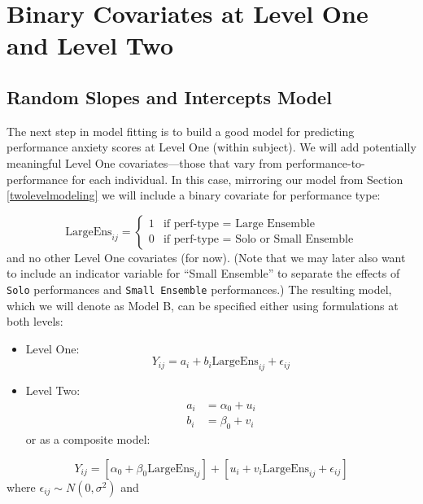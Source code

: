 \documentclass[
]{krantz}
\providecommand{\tightlist}{%
  \setlength{\itemsep}{0pt}\setlength{\parskip}{0pt}}
\begin{document}
\hypertarget{modelb}{%
\section{Binary Covariates at Level One and Level Two}\label{modelb}}

\hypertarget{randomslopeandint}{%
\subsection{Random Slopes and Intercepts Model}\label{randomslopeandint}}

The next step in model fitting is to build a good model for predicting performance anxiety scores at Level One (within subject). We will add potentially meaningful Level One covariates---those that vary from performance-to-performance for each individual.  In this case, mirroring our model from Section \ref{twolevelmodeling} we will include a binary covariate for performance type:

\[ \textrm{LargeEns}_{ij} = \begin{cases} 1  & \textrm{if perf-type = Large Ensemble} \\
    0  & \textrm{if perf-type = Solo or Small Ensemble}\end{cases}\]
and no other Level One covariates (for now). (Note that we may later also want to include an indicator variable for ``Small Ensemble'' to separate the effects of \texttt{Solo} performances and \texttt{Small\ Ensemble} performances.) The resulting model, which we will denote as Model B, can be specified either using formulations at both levels:

\begin{itemize}
\tightlist
\item
  Level One:
  \begin{equation*}
  Y_{ij} = a_{i}+b_{i}\textrm{LargeEns}_{ij}+\epsilon_{ij}
  \end{equation*}
\item
  Level Two:
  \begin{align*}
  a_{i} & = \alpha_{0}+u_{i} \\
  b_{i} & = \beta_{0}+v_{i}
  \end{align*}
  or as a composite model:
\end{itemize}

\begin{equation*}
Y_{ij}=[\alpha_{0}+\beta_{0}\textrm{LargeEns}_{ij}]+[u_{i}+v_{i}\textrm{LargeEns}_{ij}+\epsilon_{ij}]
\end{equation*}
where \(\epsilon_{ij}\sim N(0,\sigma^2)\) and
\end{document}
